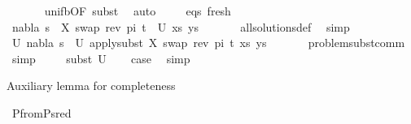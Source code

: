 \begin{isabellebody}
\ \ \ \ \ \isamarkupfalse%
\ unif{\isacharunderscore}{\kern0pt}{}b{\isacharbrackleft}{\kern0pt}OF\ subst{\isacharbrackright}{\kern0pt}\ \isamarkupfalse%
\ auto\isanewline
\isanewline
\ \ \ \isamarkupfalse%
\ eqs\ fresh\isanewline
\ \ \ \isamarkupfalse%
\ {\isachardoublequoteopen}{\isacharparenleft}{\kern0pt}nabla{}{\isacharcomma}{\kern0pt}\ {\isacharparenleft}{\kern0pt}s{}\ {\isasymbullet}\ {\isacharbrackleft}{\kern0pt}{\isacharparenleft}{\kern0pt}X{\isacharcomma}{\kern0pt}\ swap\ {\isacharparenleft}{\kern0pt}rev\ pi{\isacharparenright}{\kern0pt}\ t{\isacharprime}{\kern0pt}{\isacharparenright}{\kern0pt}{\isacharbrackright}{\kern0pt}{\isacharparenright}{\kern0pt}{\isacharparenright}{\kern0pt}\ {\isasymin}\ U\ {\isacharparenleft}{\kern0pt}xs{\isacharcomma}{\kern0pt}\ ys{\isacharparenright}{\kern0pt}{\isachardoublequoteclose}\isanewline
\ \ \ \ \ \isamarkupfalse%
\ all{\isacharunderscore}{\kern0pt}solutions{\isacharunderscore}{\kern0pt}def\ \isamarkupfalse%
\ simp\isanewline
\ \ \ \isamarkupfalse%
\ U{\isacharcolon}{\kern0pt}\ {\isachardoublequoteopen}{\isacharparenleft}{\kern0pt}nabla{}{\isacharcomma}{\kern0pt}\ s{}{\isacharparenright}{\kern0pt}\ {\isasymin}\ U\ {\isacharparenleft}{\kern0pt}apply{\isacharunderscore}{\kern0pt}subst\ {\isacharbrackleft}{\kern0pt}{\isacharparenleft}{\kern0pt}X{\isacharcomma}{\kern0pt}\ swap\ {\isacharparenleft}{\kern0pt}rev\ pi{\isacharparenright}{\kern0pt}\ t{\isacharprime}{\kern0pt}{\isacharparenright}{\kern0pt}{\isacharbrackright}{\kern0pt}\ {\isacharparenleft}{\kern0pt}xs{\isacharcomma}{\kern0pt}\ ys{\isacharparenright}{\kern0pt}{\isacharparenright}{\kern0pt}{\isachardoublequoteclose}\isanewline
\ \ \ \ \ \isamarkupfalse%
\ problem{\isacharunderscore}{\kern0pt}subst{\isacharunderscore}{\kern0pt}comm\ \isamarkupfalse%
\ simp\isanewline
\isanewline
\ \ \ \isamarkupfalse%
\ subst\ U\isanewline
\ \ \isamarkupfalse%
\ {\isacharquery}{\kern0pt}case\ \isamarkupfalse%
\ simp\isanewline
{}\isamarkupfalse%
%
\endisatagproof
{\isafoldproof}%
%
\isadelimproof
%
\endisadelimproof
%
\begin{isamarkuptext}%
Auxiliary lemma for completeness%
\end{isamarkuptext}\isamarkuptrue%
\isamarkupfalse%
\ P{}{\isacharunderscore}{\kern0pt}from{\isacharunderscore}{\kern0pt}P{}{\isacharunderscore}{\kern0pt}sred{\isacharcolon}{\kern0pt}\ \isanewline

\end{isabellebody}
